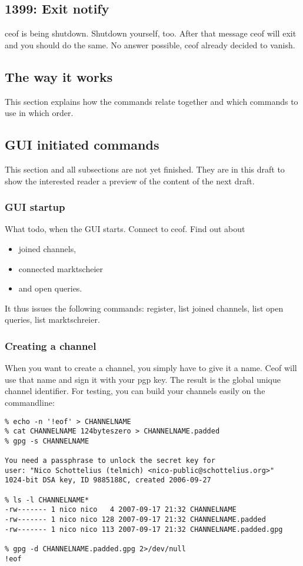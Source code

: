 \documentclass[12pt,a4paper]{book}
\begin{document}
\subsection{1399: Exit notify}
ceof is being shutdown.
Shutdown yourself, too.
After that message ceof will exit and you should do the same.
No answer possible, ceof already decided to vanish.
\subsection{The way it works}
This section explains how the commands relate together and which commands to use
in which order.

\subsection{GUI initiated commands}
This section and all subsections are not yet finished. They
are in this draft to show the interested reader a preview of the
content of the next draft.
\subsubsection{GUI startup}
What todo, when the GUI starts.
Connect to ceof. Find out about
\begin{itemize}
\item joined channels,
\item connected marktscheier
\item and open queries.
\end{itemize}
It thus issues the following commands:
register, list joined channels, list open queries, list marktschreier.
\subsubsection{Creating a channel}
When you want to create a channel, you simply have to give it a name.
Ceof will use that name and sign it with your pgp key. The result is the
global unique channel identifier. For testing, you can build your channels
easily on the commandline:
\begin{verbatim}
% echo -n '!eof' > CHANNELNAME
% cat CHANNELNAME 124byteszero > CHANNELNAME.padded
% gpg -s CHANNELNAME 

You need a passphrase to unlock the secret key for
user: "Nico Schottelius (telmich) <nico-public@schottelius.org>"
1024-bit DSA key, ID 9885188C, created 2006-09-27

% ls -l CHANNELNAME*
-rw------- 1 nico nico   4 2007-09-17 21:32 CHANNELNAME
-rw------- 1 nico nico 128 2007-09-17 21:32 CHANNELNAME.padded
-rw------- 1 nico nico 113 2007-09-17 21:32 CHANNELNAME.padded.gpg

% gpg -d CHANNELNAME.padded.gpg 2>/dev/null
!eof
\end{verbatim}
\end{document}
